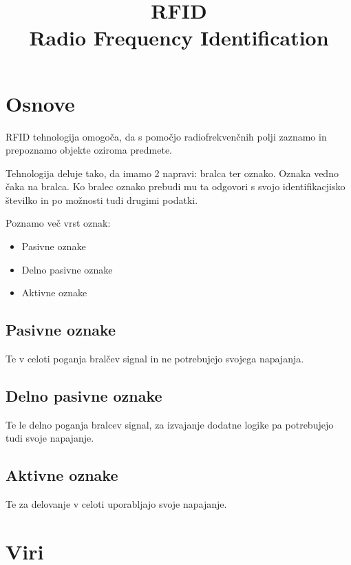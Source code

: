 \documentclass[]{article}
\title{RFID \\
       \large Radio Frequency Identification}
\date{}
\begin{document}
\maketitle

\newpage

\tableofcontents

\newpage

\section{Osnove}
RFID tehnologija omogo\v{c}a, da s pomo\v{c}jo
radiofrekven\v{c}nih polji zaznamo in prepoznamo objekte oziroma
predmete.

Tehnologija deluje tako, da imamo 2 napravi: bralca ter oznako.
Oznaka vedno \v{c}aka na bralca. Ko bralec oznako prebudi
mu ta odgovori s svojo identifikacjisko \v{s}tevilko in po
mo\v{z}nosti tudi drugimi podatki.

Poznamo ve\v{c} vrst oznak:
\begin{itemize}
  \item Pasivne oznake
  \item Delno pasivne oznake
  \item Aktivne oznake
\end{itemize}

\subsection{Pasivne oznake}
Te v celoti poganja bral\v{c}ev signal in ne potrebujejo svojega
napajanja.

\subsection{Delno pasivne oznake}
Te le delno poganja bralcev signal, za izvajanje dodatne logike
pa potrebujejo tudi svoje napajanje.

\subsection{Aktivne oznake}
Te za delovanje v celoti uporabljajo svoje napajanje.

\newpage

\section{Viri}
\printbibliography[heading=none] %
\end{document}
